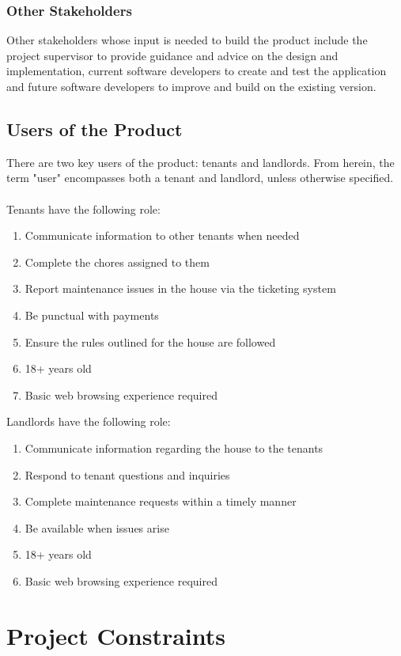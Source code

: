 \documentclass[12pt]{article}
\begin{document}
\subsubsection {Other Stakeholders}
Other stakeholders whose input is needed to build the product include the project supervisor to provide guidance and advice on the design and implementation, current software developers to create and test the application and future software developers to improve and build on the existing version.
\subsection{Users of the Product}
There are two key users of the product: tenants and landlords. From herein, the term "user" encompasses both a tenant and landlord, unless otherwise specified. \\ \\
Tenants have the following role:
\begin{enumerate}
\item Communicate information to other tenants when needed
\item Complete the chores assigned to them
\item Report maintenance issues in the house via the ticketing system
\item Be punctual with payments
\item Ensure the rules outlined for the house are followed
\item 18+ years old
\item Basic web browsing experience required
\end{enumerate}
Landlords have the following role:
\begin{enumerate}
\item Communicate information regarding the house to the tenants
\item Respond to tenant questions and inquiries
\item Complete maintenance requests within a timely manner
\item Be available when issues arise
\item 18+ years old
\item Basic web browsing experience required
\end{enumerate}


\section{Project Constraints} 
	
\end{document}
